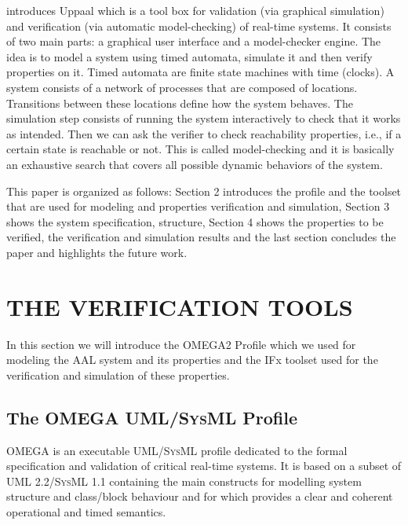 \documentclass[a4paper,twoside]{article}
\def\sysml{\textsc{SysML}}
\def\uml{\textsc{UML}}
\begin{document}
\cite{test8} introduces Uppaal which is a tool box for validation (via graphical simulation) and verification (via automatic model-checking) of real-time systems. It consists of two main parts: a graphical user interface and a model-checker engine. The idea is to model a system using timed automata, simulate it and then verify properties on it. Timed automata are finite state machines with time (clocks). A system consists of a network of processes that are composed of locations. Transitions between these locations define how the system behaves. The simulation step consists of running the system interactively to check that it works as intended. Then we can ask the verifier to check reachability properties, i.e., if a certain state is reachable or not. This is called model-checking and it is basically an exhaustive search that covers all possible dynamic behaviors of the system.

This paper is organized as follows: Section 2 introduces the profile and the toolset that are used for modeling and properties verification and simulation,  Section 3 shows the system specification, structure, Section 4 shows the properties to be verified, the verification and simulation results and the last section concludes the paper and highlights the future work.

\section{\uppercase{The verification tools}}
\label{verification tools}
\noindent In this section we will introduce the OMEGA2 Profile which we used for modeling the AAL system and its properties and the IFx toolset used for the verification and simulation of these properties. 

\subsection{The OMEGA \uml{}/\sysml{} Profile}

OMEGA is an executable \uml{}/\sysml{} profile dedicated to the formal specification and validation of critical real-time systems. It is based on a subset of \uml{} 2.2/\sysml{} 1.1 containing the main constructs for modelling system structure and class/block behaviour and for which provides a clear and coherent operational and timed semantics.

\end{document}
